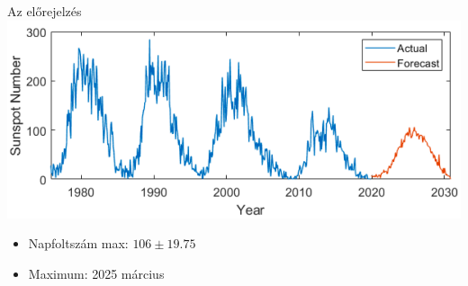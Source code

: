 \begin{frame}{Az előrejelzés}
    \centering
    \includegraphics[width=1.0\textwidth]{figures/forecasting_solar_cycle.png}
    \begin{itemize}
        \item Napfoltszám max: $106 \pm 19.75$
        \item Maximum: 2025 március
    \end{itemize}
\end{frame}